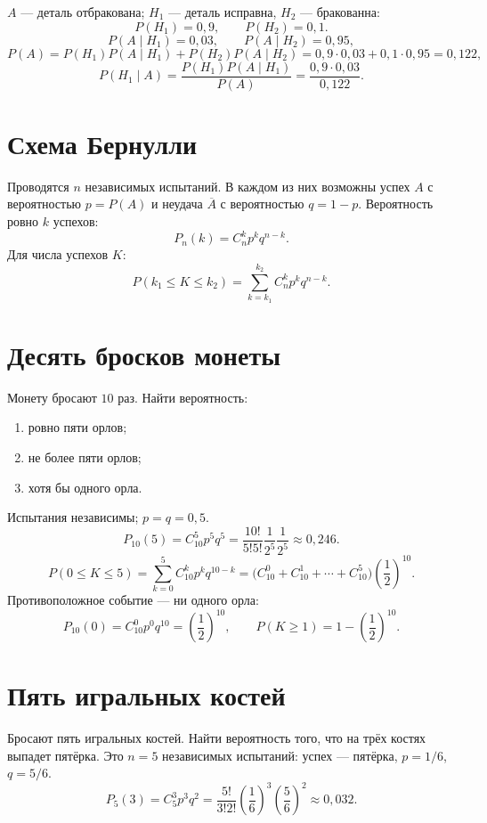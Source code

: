 $A$ --- деталь отбракована; $H_1$ --- деталь исправна,
$H_2$ --- бракованна:
\[
 P(H_1)=0{,}9,\qquad P(H_2)=0{,}1.
\]
\[
 P(A\mid H_1)=0{,}03,\qquad P(A\mid H_2)=0{,}95,
\]
\[
 P(A)=P(H_1)P(A\mid H_1)+P(H_2)P(A\mid H_2)
 =0{,}9\cdot0{,}03+0{,}1\cdot0{,}95=0{,}122,
\]
\[
 P(H_1\mid A)=\frac{P(H_1)P(A\mid H_1)}{P(A)}
 =\frac{0{,}9\cdot0{,}03}{0{,}122}.
\]

\section*{Схема Бернулли}
Проводятся $n$ независимых испытаний. В каждом из них возможны успех $A$
с вероятностью $p=P(A)$ и неудача $\overline A$ с вероятностью $q=1-p$.
Вероятность ровно $k$ успехов:
\[
 \boxed{P_n(k)=C_n^k p^kq^{n-k}.}
\]
Для числа успехов $K$:
\[
 P(k_1\le K\le k_2)=\sum_{k=k_1}^{k_2}C_n^kp^kq^{n-k}.
\]

\section*{Десять бросков монеты}
Монету бросают $10$ раз. Найти вероятность:
\begin{enumerate}
 \item ровно пяти орлов;
 \item не более пяти орлов;
 \item хотя бы одного орла.
\end{enumerate}
Испытания независимы; $p=q=0{,}5$.
\[
 P_{10}(5)=C_{10}^5p^5q^5
 =\frac{10!}{5!5!}\frac1{2^5}\frac1{2^5}\approx0{,}246.
\]
\[
 P(0\le K\le5)=\sum_{k=0}^5C_{10}^kp^kq^{10-k}
 =\bigl(C_{10}^0+C_{10}^1+\cdots+C_{10}^5\bigr)\left(\frac12\right)^{10}.
\]
Противоположное событие --- ни одного орла:
\[
 P_{10}(0)=C_{10}^0p^0q^{10}=\left(\frac12\right)^{10},\qquad
 P(K\ge1)=1-\left(\frac12\right)^{10}.
\]

\section*{Пять игральных костей}
Бросают пять игральных костей. Найти вероятность того, что на трёх
костях выпадет пятёрка.
Это $n=5$ независимых испытаний: успех --- пятёрка,
$p=1/6$, $q=5/6$.
\[
 P_5(3)=C_5^3p^3q^2
 =\frac{5!}{3!2!}\left(\frac16\right)^3\left(\frac56\right)^2
 \approx0{,}032.
\]

